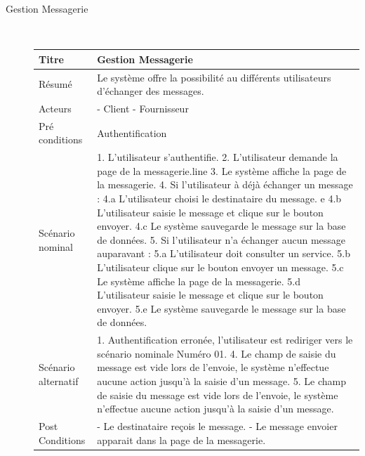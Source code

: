 \documentclass[french]{report}
\begin{document}
\begin{description}
    \newpage
        \item[Gestion Messagerie] \hfill \\
        \begin{minipage}{\linewidth}
        \centering
            \def\arraystretch{2}
            \begin{tabular}{|m{3cm}|m{9cm}|}
            \hline
            Titre                & Gestion Messagerie   \\ 
            \hline
            Résumé               & Le système offre la possibilité au différents utilisateurs d'échanger des messages.  \\ 
            \hline
            Acteurs              & - Client \newline  - Fournisseur  \\ 
            \hline
            Pré conditions       & Authentification  \\ 
            \hline
            Scénario nominal     &  
                1. L'utilisateur s'authentifie. 
                2. L'utilisateur demande la page de la messagerie.line
                3. Le système affiche la page de la messagerie. 
                4. Si l'utilisateur à déjà échanger un message :
                	4.a L'utilisateur choisi le destinataire du message. e
                	4.b L'utilisateur saisie le message et clique sur le bouton envoyer. 
                	4.c Le système sauvegarde le message sur la base de données. 
                5. Si l'utilisateur n'a échanger aucun message auparavant : 
                	5.a L'utilisateur doit consulter un service. 
                	5.b L'utilisateur clique sur le bouton envoyer un message. 
                	5.c Le système affiche la page de la messagerie. 
                	5.d L'utilisateur saisie le message et clique sur le bouton envoyer. 
                	5.e Le système sauvegarde le message sur la base de données. 
                \\ 
            \hline
            Scénario alternatif &   
                1. Authentification erronée, l'utilisateur est rediriger vers le scénario nominale Numéro 01. 
                4. Le champ de saisie du message est vide lors de l'envoie, le système n'effectue aucune action jusqu'à la saisie d'un message.
                5. Le champ de saisie du message est vide lors de l'envoie, le système n'effectue aucune action jusqu'à la saisie d'un message.
                
            \\ 
            \hline
            Post Conditions & 
                - Le destinataire reçois le message. 
                - Le message envoier apparait dans la page de la messagerie.  
            \\
            \hline
            \end{tabular}
        \end{minipage}
        

\end{description}
\end{document}
